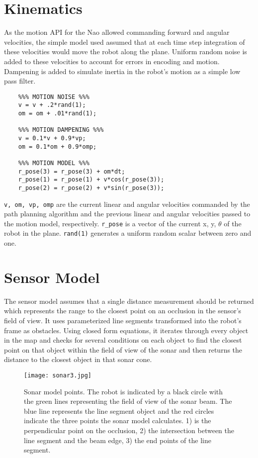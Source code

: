 \section{Kinematics}
As the motion API for the Nao allowed commanding forward and angular velocities, the simple model used assumed that at each time step integration of these velocities would move the robot along the plane. Uniform random noise is added to these velocities to account for errors in encoding and motion. Dampening is added to simulate inertia in the robot's motion as a simple low pass filter. \\
\lstset{language=Matlab}
\begin{lstlisting}
	%%% MOTION NOISE %%%
	v = v + .2*rand(1);
	om = om + .01*rand(1);
	    
	%%% MOTION DAMPENING %%%
	v = 0.1*v + 0.9*vp;
	om = 0.1*om + 0.9*omp;
	   
	%%% MOTION MODEL %%%
	r_pose(3) = r_pose(3) + om*dt;
	r_pose(1) = r_pose(1) + v*cos(r_pose(3));
	r_pose(2) = r_pose(2) + v*sin(r_pose(3));
\end{lstlisting}
\lstinline$v, om, vp, omp$ are the current linear and angular velocities commanded by the path planning algorithm and the previous linear and angular velocities passed to the motion model, respectively. \lstinline$r_pose$ is a vector of the current x, y, $\theta$ of the robot in the plane. \lstinline$rand(1)$ generates a uniform random scalar between zero and one.

\section{Sensor Model}
The sensor model assumes that a single distance measurement should be returned which represents the range to the closest point on an occlusion in the sensor's field of view.
It uses parameterized line segments transformed into the robot's frame as obstacles. Using closed form equations, it iterates through every object in the map and checks for several conditions on each object to find the closest point on that object within the field of view of the sonar and then returns the distance to the closest object in that sonar cone.

\begin{figure}[h]
	\centering
	\texttt{[image: sonar3.jpg]}
	\caption[Sonar model points.]
	{Sonar model points. The robot is indicated by a black circle with the green lines representing the field of view of the sonar beam. The blue line represents the line segment object and the red circles indicate the three points the sonar model calculates. 1) is the perpendicular point on the occlusion, 2) the intersection between the line segment and the beam edge, 3) the end points of the line segment.}
	\label{fig:sonar3}
\end{figure}

